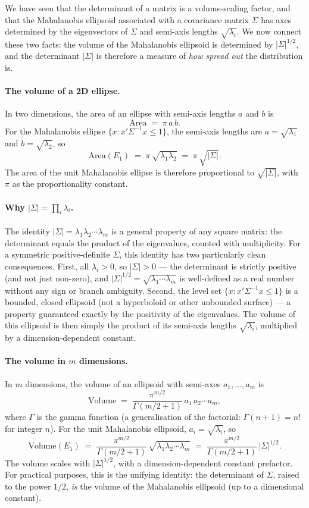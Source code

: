\documentclass[11pt, a4paper, oneside]{article}
\begin{document}
We have seen that the determinant of a matrix is a volume-scaling
factor, and that the
Mahalanobis ellipsoid associated with a covariance matrix $\Sigma$
has axes determined by the eigenvectors of $\Sigma$ and semi-axis
lengths $\sqrt{\lambda_i}$.
We now connect these two facts: the volume of the Mahalanobis
ellipsoid is determined by $|\Sigma|^{1/2}$, and the determinant
$|\Sigma|$ is therefore a measure of \emph{how spread out} the
distribution is.

\paragraph{The volume of a 2D ellipse.}
In two dimensions, the area of an ellipse with semi-axis lengths $a$
and $b$ is
\[
\mathrm{Area} \;=\; \pi\, a\, b.
\]
For the Mahalanobis ellipse $\{x : x' \Sigma^{-1} x \leq 1\}$, the
semi-axis lengths are $a = \sqrt{\lambda_1}$ and $b = \sqrt{\lambda_2}$,
so
\[
\mathrm{Area}(E_1) \;=\; \pi\, \sqrt{\lambda_1 \lambda_2} \;=\; \pi\, \sqrt{|\Sigma|}.
\]
The area of the unit Mahalanobis ellipse is therefore proportional
to $\sqrt{|\Sigma|}$, with $\pi$ as the proportionality constant.

\paragraph{Why $|\Sigma| = \prod_i \lambda_i$.}
The identity $|\Sigma| = \lambda_1 \lambda_2 \cdots \lambda_m$ is a
general property of any square matrix: the determinant equals the
product of the eigenvalues, counted with multiplicity. For a
symmetric positive-definite $\Sigma$, this identity has two
particularly clean consequences. First, all $\lambda_i > 0$, so
$|\Sigma| > 0$ — the determinant is strictly positive (and not just
non-zero), and $|\Sigma|^{1/2} = \sqrt{\lambda_1 \cdots \lambda_m}$
is well-defined as a real number without any sign or branch
ambiguity. Second, the level set
$\{x : x'\Sigma^{-1}x \leq 1\}$ is a bounded, closed ellipsoid (not
a hyperboloid or other unbounded surface) — a property guaranteed
exactly by the positivity of the eigenvalues. The volume of this
ellipsoid is then simply the product of its semi-axis lengths
$\sqrt{\lambda_i}$, multiplied by a dimension-dependent constant.

\paragraph{The volume in $m$ dimensions.}
In $m$ dimensions, the volume of an ellipsoid with semi-axes
$a_1, \ldots, a_m$ is
\[
\mathrm{Volume} \;=\; \frac{\pi^{m/2}}{\Gamma(m/2 + 1)}\, a_1\, a_2 \cdots a_m,
\]
where $\Gamma$ is the gamma function (a generalisation of the
factorial: $\Gamma(n + 1) = n!$ for integer $n$). For the unit
Mahalanobis ellipsoid, $a_i = \sqrt{\lambda_i}$, so
\[
\mathrm{Volume}(E_1) \;=\; \frac{\pi^{m/2}}{\Gamma(m/2 + 1)}\, \sqrt{\lambda_1 \lambda_2 \cdots \lambda_m} \;=\; \frac{\pi^{m/2}}{\Gamma(m/2 + 1)}\, |\Sigma|^{1/2}.
\]
The volume scales with $|\Sigma|^{1/2}$, with a dimension-dependent
constant prefactor. For practical purposes, this is the unifying
identity: the determinant of $\Sigma$, raised to the power $1/2$,
\emph{is} the volume of the Mahalanobis ellipsoid (up to a
dimensional constant).
\end{document}
